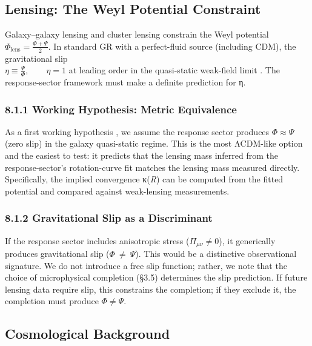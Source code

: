 \documentclass[11pt]{article}
\begin{document}
\subsection{Lensing: The Weyl Potential Constraint}\label{lensing-the-weyl-potential-constraint}

Galaxy--galaxy lensing and cluster lensing constrain the Weyl potential \(\Phi_{\text{lens}} = \frac{\Phi + \Psi}{2}\). In standard GR with a perfect-fluid source (including CDM), the gravitational slip\\
\(\eta \equiv \frac{\Psi}{\Phi},\quad\quad\eta = 1\) at leading order in the quasi-static weak-field limit \citep{PoissonWill2014, Wald1984GR}. The response-sector framework must make a definite prediction for η.

\subsubsection{8.1.1 Working Hypothesis: Metric Equivalence}\label{working-hypothesis-metric-equivalence}

As a first working hypothesis \citep{Wald1984GR, Carroll2019Spacetime}, we assume the response sector produces \(\Phi \approx \Psi\) (zero slip) in the galaxy quasi-static regime. This is the most ΛCDM-like option and the easiest to test: it predicts that the lensing mass inferred from the response-sector's rotation-curve fit matches the lensing mass measured directly. Specifically, the implied convergence κ(\emph{R}) can be computed from the fitted potential and compared against weak-lensing measurements.

\subsubsection{8.1.2 Gravitational Slip as a Discriminant}\label{gravitational-slip-as-a-discriminant}

If the response sector includes anisotropic stress (\(\Pi_{\mu\nu} \neq 0\)), it generically produces gravitational slip (\(\Phi\  \neq \ \Psi\)). This would be a distinctive observational signature. We do not introduce a free slip function; rather, we note that the choice of microphysical completion (§3.5) determines the slip prediction. If future lensing data require slip, this constrains the completion; if they exclude it, the completion must produce \(\Phi \neq \Psi\).

\subsection{Cosmological Background}\label{cosmological-background}
\end{document}
